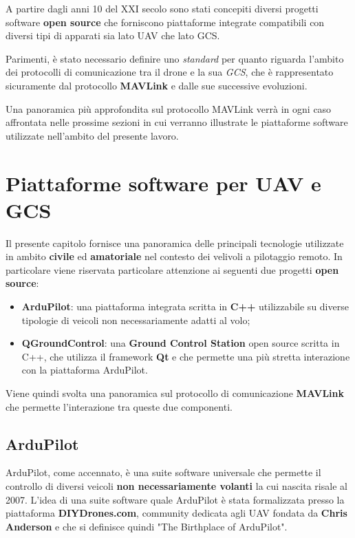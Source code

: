 \documentclass[a4paper, 12pt, oneside]{article}
\begin{document}
A partire dagli anni 10 del XXI secolo sono stati concepiti diversi progetti software \textbf{open source} che forniscono piattaforme integrate compatibili con diversi tipi di apparati sia lato UAV che lato GCS. 

Parimenti, è stato necessario definire uno \textit{standard} per quanto riguarda l'ambito dei protocolli di comunicazione tra il drone e la sua \textit{GCS}, che è rappresentato sicuramente dal protocollo \textbf{MAVLink} e dalle sue successive evoluzioni. 

Una panoramica più approfondita sul protocollo MAVLink verrà in ogni caso affrontata nelle prossime sezioni in cui verranno illustrate le piattaforme software utilizzate nell'ambito del presente lavoro.

\newpage

\section{Piattaforme software per UAV e GCS}
Il presente capitolo fornisce una panoramica delle principali tecnologie utilizzate in ambito \textbf{civile} ed \textbf{amatoriale} nel contesto dei velivoli a pilotaggio remoto. In particolare viene riservata particolare attenzione ai seguenti due progetti \textbf{open source}:

\begin{itemize}
    \item \textbf{ArduPilot}: una piattaforma integrata scritta in \textbf{C++} utilizzabile su diverse tipologie di veicoli non necessariamente adatti al volo;
    \item \textbf{QGroundControl}: una \textbf{Ground Control Station} open source scritta in C++, che utilizza il framework \textbf{Qt} e che permette una più stretta interazione con la piattaforma ArduPilot.
\end{itemize}

Viene quindi svolta una panoramica sul protocollo di comunicazione \textbf{MAVLink} che permette l'interazione tra queste due componenti.

\subsection{ArduPilot}

ArduPilot, come accennato, è una suite software universale che permette il controllo di diversi veicoli \textbf{non necessariamente volanti} \cite{ardupilot} la cui nascita risale al 2007.  L'idea di una suite software quale ArduPilot è stata formalizzata presso la piattaforma \textbf{DIYDrones.com}, community dedicata agli UAV fondata da \textbf{Chris Anderson} e che si definisce quindi "The Birthplace of ArduPilot"\cite{diy-drones}.
\end{document}
